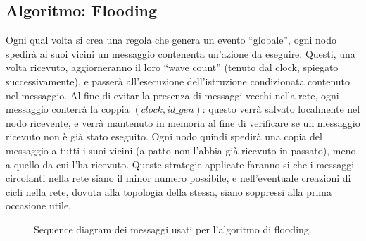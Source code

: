 \documentclass[italian]{memoir}
\begin{document}
\subsection{Algoritmo: Flooding}
Ogni qual volta si crea una regola che genera un evento ``globale'', ogni nodo spedirà
	   ai suoi vicini un messaggio contenenta un'azione da eseguire. Questi, una volta ricevuto,
	   aggiorneranno il loro ``wave count'' (tenuto dal clock, spiegato successivamente),
	   e passerà all'esecuzione dell'istruzione condizionata contenuto nel messaggio. Al
	   fine di evitar la presenza di messaggi vecchi nella rete, ogni messaggio conterrà
	   la coppia $(clock,id\_gen)$: questo verrà salvato localmente nel nodo ricevente,
	   e verrà mantenuto in memoria al fine di verificare se un messaggio ricevuto non
	   è già stato eseguito. Ogni nodo quindi spedirà una copia del messaggio a tutti
	   i suoi vicini (a patto non l'abbia già ricevuto in passato), meno a quello da cui
	   l'ha ricevuto. Queste strategie applicate faranno si che i messaggi circolanti nella
	   rete siano il minor numero possibile, e nell'eventuale creazioni di cicli nella rete,
	   dovuta alla topologia della stessa, siano soppressi alla prima occasione utile.

\begin{figure}[H]
\caption{Sequence diagram dei messaggi usati per l'algoritmo di flooding.}
\label{img:flooding}
\end{figure}
\end{document}

